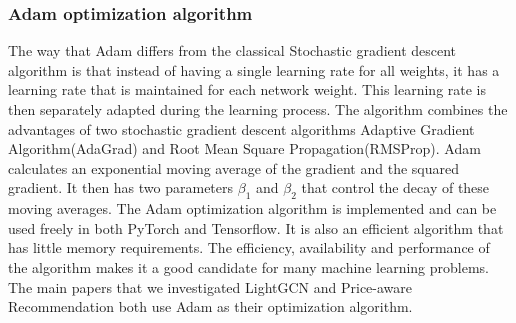 \subsubsection{Adam optimization algorithm}
The way that Adam differs from the classical Stochastic gradient descent algorithm is that instead of having a single learning rate for all weights, it has a learning rate that is maintained for each network weight\cite{Adam}.
This learning rate is then separately adapted during the learning process.
The algorithm combines the advantages of two stochastic gradient descent algorithms Adaptive Gradient Algorithm(AdaGrad) and Root Mean Square Propagation(RMSProp).
Adam calculates an exponential moving average of the gradient and the squared gradient.
It then has two parameters $\beta_1$ and $\beta_2$ that control the decay of these moving averages.
The Adam optimization algorithm is implemented and can be used freely in both PyTorch and Tensorflow.
It is also an efficient algorithm that has little memory requirements.
The efficiency, availability and performance of the algorithm makes it a good candidate for many machine learning problems.
The main papers that we investigated LightGCN \cite{lightgcn} and Price-aware Recommendation\cite{Priceaware} both use Adam as their optimization algorithm.
